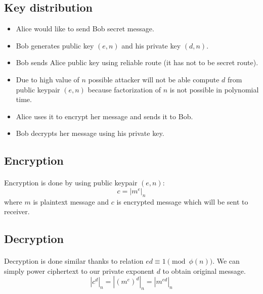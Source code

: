 \documentclass[thesis=B,english]{FITthesis}[2012/10/20]
\begin{document}
{{\subsection{Key distribution}
\begin{itemize}
 \item Alice would like to send Bob secret message.
 \item Bob generates public key \((e,n)\) and his private key \((d,n)\).
 \item Bob sends Alice public key using reliable route (it has not to be secret route).
 \item Due to high value of \(n\) possible attacker will not be able compute \(d\) from public keypair \((e,n)\) because factorization of \(n\) is not possible in polynomial time.
 \item Alice uses it to encrypt her message and sends it to Bob. 
 \item Bob decrypts her message using his private key.
\end{itemize}

\subsection{Encryption}
\paragraph*{}
{Encryption is done by using public keypair \((e, n)\): \[c = | m^e | _n\]
where \(m\) is plaintext message and \(c\) is encrypted message which will be sent to receiver.
}

\subsection{Decryption}
\paragraph*{}
{Decryption is done similar thanks to relation \(ed \equiv 1 \pmod{\phi(n)}\). We can simply power ciphertext to our private exponent \(d\) to obtain original message.  
\[ |c^d|_n = |(m^e)^d|_n = | m^{ed}|_n \]

}}}
\end{document}
